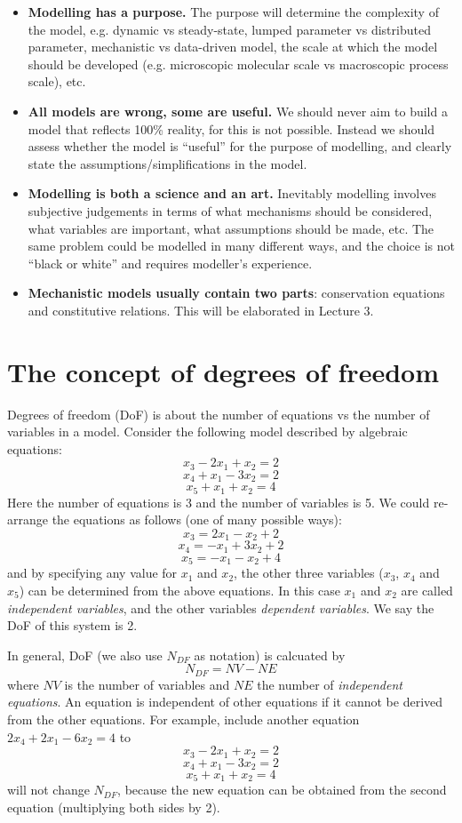 \documentclass[a4paper,11pt]{article}
\theoremstyle{definition}
\begin{document}
\begin{itemize}
	\item \textbf{Modelling has a purpose.}  The purpose will determine
		the complexity of the model, e.g. dynamic vs steady-state,
		lumped parameter vs distributed parameter, mechanistic vs data-driven model,
		the scale at which	the model should be developed (e.g. microscopic molecular scale vs
		macroscopic process scale), etc.
	\item \textbf{All models are wrong, some are useful.} We should never aim to
		build a model that reflects 100\% reality, for this is not possible.
		Instead we should assess whether the model is ``useful'' for the purpose of modelling,
		and clearly state the assumptions/simplifications in the model.
	\item \textbf{Modelling is both a science and an art.} Inevitably modelling involves
		subjective judgements in terms of what mechanisms should be considered, what variables
		are important, what assumptions should be made, etc. The same problem could be
		modelled in many different ways, and the choice is not ``black or white'' and requires
		modeller's experience.
	\item \textbf{Mechanistic models usually contain two parts}: conservation equations
		and constitutive relations. This will be elaborated in Lecture 3.
\end{itemize}


\section{The concept of degrees of freedom}

Degrees of freedom (DoF) is about the number of equations vs the number of variables
in a model. Consider the following model described by algebraic equations:
\[  x_3 - 2 x_1 + x_2 = 2 \]
\[  x_4 + x_1 - 3 x_2 = 2 \]
\[  x_5 + x_1 + x_2 = 4 \]
Here the number of equations is 3 and the number of variables is 5. We could re-arrange
the equations as follows (one of many possible ways):
\[  x_3 = 2 x_1 - x_2 + 2 \]
\[  x_4 = -x_1 + 3 x_2 + 2 \]
\[  x_5 = -x_1 - x_2 + 4 \]
and by specifying any value for $x_1$ and $x_2$, the other three variables
($x_3$, $x_4$ and $x_5$) can be determined from the above equations.
In this case $x_1$ and $x_2$ are called \emph{independent variables}, and the other
variables \emph{dependent variables}. We say the DoF of this system is 2.

In general, DoF (we also use $N_{DF}$ as notation) is calcuated by
\[ N_{DF} = NV - NE \]
where $NV$ is the number of variables and $NE$ the number of \emph{independent equations}.
An equation is independent of other equations if it cannot be derived from the other equations.
For example, include another equation $2 x_4 + 2 x_1 - 6 x_2 = 4$ to
\[  x_3 - 2 x_1 + x_2 = 2 \]
\[  x_4 + x_1 - 3 x_2 = 2 \]
\[  x_5 + x_1 + x_2 = 4 \]
will not change $N_{DF}$, because the new equation can be obtained from the second equation
(multiplying both sides by 2).
\end{document}

